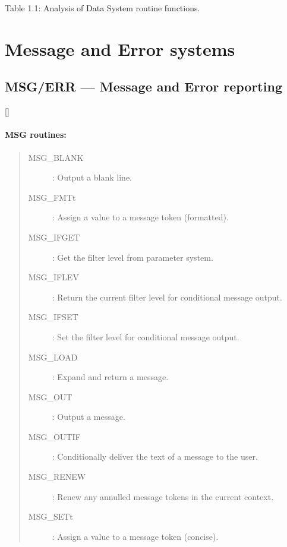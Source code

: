 \begin{center}
Table 1.1: Analysis of Data System routine functions.
\end{center}

\newpage

\section{Message and Error systems}
\label{R_ME}

\subsection{MSG/ERR --- Message and Error reporting}

\vspace{-9mm}

\hfill []

\vspace{2mm}

\paragraph{MSG routines:}

\begin{quote}
\begin{description}
\item [MSG\_BLANK] : Output a blank line.
\item [MSG\_FMTt] : Assign a value to a message token (formatted).
\item [MSG\_IFGET] : Get the filter level from parameter system.
\item [MSG\_IFLEV] : Return the current filter level for conditional message output.
\item [MSG\_IFSET] : Set the filter level for conditional message output.
\item [MSG\_LOAD] : Expand and return a message.
\item [MSG\_OUT] : Output a message.
\item [MSG\_OUTIF] : Conditionally deliver the text of a message to the user.
\item [MSG\_RENEW] : Renew any annulled message tokens in the current context.
\item [MSG\_SETt] : Assign a value to a message token (concise).
\end{description}
\end{quote}

\vspace*{10mm}

